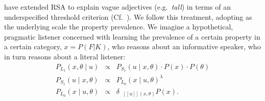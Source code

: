 \documentclass[10pt,letterpaper]{article}
\newcommand{\denote}[1]{\mbox{ $[\![ #1 ]\!]$}}
\newcommand{\mht}[1]{\textcolor{Blue}{[mht: #1]}}
\begin{document}
%
 have extended RSA to explain vague adjectives (e.g.~\emph{tall}) in terms of an underspecified threshold criterion (Cf.~). 
We follow this treatment, adopting as the underlying scale the property prevalence.
We imagine a hypothetical, pragmatic listener concerned with learning the prevalence of a certain property in a certain category, $x=P(F|K)$, who reasons about an informative speaker, who in turn reasons about a literal listener:
\begin{eqnarray}
P_{L_{1}}(x , \theta \mid u) &\propto& P_{S_{1}}(u \mid x, \theta) \cdot P(x) \cdot P(\theta) \label{eq:L1}\\
P_{S_{1}}(u \mid x, \theta) &\propto&  {P_{L_{0}}(x \mid u, \theta)}^{\lambda} \label{eq:S1}\\
P_{L_{0}}(x \mid u, \theta) &\propto& {\delta_{\denote{u}(x, \theta)} P(x)}. \label{eq:L0}
\end{eqnarray}


%
\end{document}
